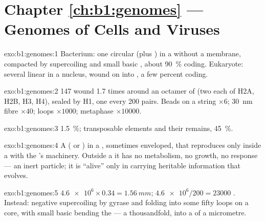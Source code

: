 \section*{Chapter \ref{ch:b1:genomes} --- Genomes of Cells and Viruses}

\begin{solution}{exo:b1:genomes:1}
Bacterium: one circular  (plus ) in a 
without a membrane, compacted by supercoiling and small basic
, about \qty{90}{\%} coding. Eukaryote: several linear
 in a nucleus, wound on  into , a few
percent coding.
\end{solution}

\begin{solution}{exo:b1:genomes:2}
147  wound 1.7 times around an octamer of  (two each
of H2A, H2B, H3, H4), sealed by H1, one every 200 pairs. Beads on a
string $\times 6$; \qty{30}{nm} fibre $\times 40$; loops $\times 1000$;
metaphase  $\times \num{10000}$.
\end{solution}

\begin{solution}{exo:b1:genomes:3}
\qty{1.5}{\%}; transposable elements and their remains, \qty{45}{\%}.
\end{solution}

\begin{solution}{exo:b1:genomes:4}
A  ( or ) in a  , sometimes enveloped, that
reproduces only inside a  with the 's machinery. Outside a
 it has no metabolism, no growth, no response --- an inert
particle; it is ``alive'' only in carrying heritable information that
evolves.
\end{solution}

\begin{solution}{exo:b1:genomes:5}
$\num{4.6e6}\times 0.34 = \qty{1.56}{mm}$; $\num{4.6e6}/200 = \num{23000}$
. Instead: negative supercoiling by gyrase and folding into
some fifty loops on a  core, with small basic  bending
the  --- a thousandfold, into a  of a micrometre.
\end{solution}

